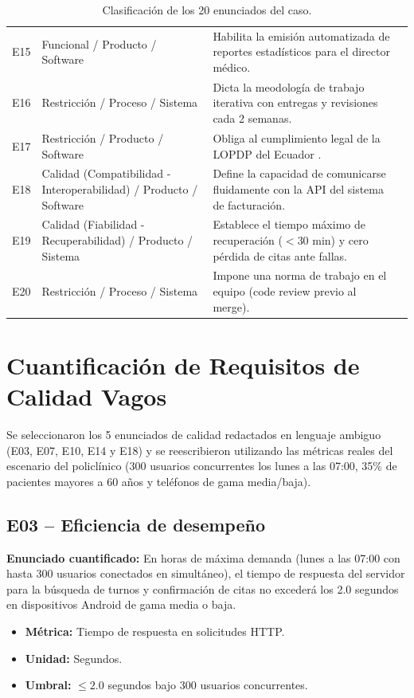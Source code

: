\documentclass[11pt, a4paper]{article}
\begin{document}
\begin{table}[h!]
\begin{tabularx}{\textwidth}{l X X l}
E15 & Funcional / Producto / Software & Habilita la emisi\'on automatizada de reportes estad\'isticos para el director m\'edico. \\
E16 & Restricci\'on / Proceso / Sistema & Dicta la meodolog\'ia de trabajo iterativa con entregas y revisiones cada 2 semanas. \\
E17 & Restricci\'on / Producto / Software & Obliga al cumplimiento legal de la LOPDP del Ecuador \cite{lopdp2021}. \\
E18 & Calidad (Compatibilidad - Interoperabilidad) / Producto / Software & Define la capacidad de comunicarse fluidamente con la API del sistema de facturaci\'on. \\
E19 & Calidad (Fiabilidad - Recuperabilidad) / Producto / Sistema & Establece el tiempo m\'aximo de recuperaci\'on ($<$30 min) y cero p\'erdida de citas ante fallas. \\
E20 & Restricci\'on / Proceso / Sistema & Impone una norma de trabajo en el equipo (code review previo al merge). \\
\bottomrule
\end{tabularx}
\caption{Clasificaci\'on de los 20 enunciados del caso.}
\label{tab:clasificacion}
\end{table}

\section{Cuantificaci\'on de Requisitos de Calidad Vagos}
Se seleccionaron los 5 enunciados de calidad redactados en lenguaje ambiguo (E03, E07, E10, E14 y E18) y se reescribieron utilizando las m\'etricas reales del escenario del policl\'inico (300 usuarios concurrentes los lunes a las 07:00, 35\% de pacientes mayores a 60 a\~nos y tel\'efonos de gama media/baja).

\subsection{E03 -- Eficiencia de desempe\~no}
\textbf{Enunciado cuantificado:} En horas de m\'axima demanda (lunes a las 07:00 con hasta 300 usuarios conectados en simult\'aneo), el tiempo de respuesta del servidor para la b\'usqueda de turnos y confirmaci\'on de citas no exceder\'a los 2.0 segundos en dispositivos Android de gama media o baja.
\begin{itemize}
    \item \textbf{M\'etrica:} Tiempo de respuesta en solicitudes HTTP.
    \item \textbf{Unidad:} Segundos.
    \item \textbf{Umbral:} $\le 2.0$ segundos bajo 300 usuarios concurrentes.
\end{itemize}
\end{document}
